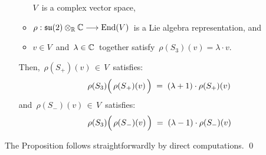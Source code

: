 \begin{proposition}
\begin{enumerate}
\begin{itemize}
		$V$\, is a complex vector space,
	\item
		$\rho : \mathfrak{su}(2) \otimes_{\mathbb{R}} \mathbb{C} \longrightarrow \textnormal{End}(V)$\,
		is a Lie algebra representation, and
	\item	
		$v \in V$\, and \,$\lambda \in \mathbb{C}$\, together satisfy \,$\rho(S_{3})(v) = \lambda \cdot v$.
	\end{itemize}	
	Then, \,$\rho(S_{+})(v) \,\in\, V$\, satisfies:
	\begin{equation*}
	\rho(S_{3})\!\left(\,\rho(\overset{{\color{white}.}}{S}_{+})(v)\,\right)
	\; = \;
		(\lambda+1) \cdot \rho(S_{+})(v)\,
	\end{equation*}
	and
	\,$\rho(S_{-})(v) \,\in\, V$\, satisfies:
	\begin{equation*}
	\rho(S_{3})\!\left(\,\rho(\overset{{\color{white}.}}{S}_{-})(v)\,\right)
	\; = \;
		(\lambda-1) \cdot \rho(S_{-})(v)\,
	\end{equation*}
\end{enumerate}
\end{proposition}
\proof
The Proposition follows straightforwardly by direct computations.
\qed


